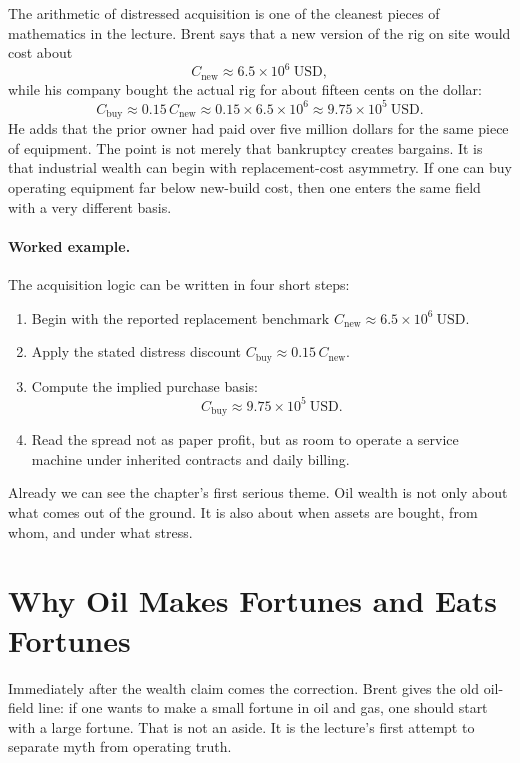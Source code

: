 The arithmetic of distressed acquisition is one of the cleanest pieces of mathematics in the lecture. Brent says that a new version of the rig on site would cost about
\begin{equation}
C_{\mathrm{new}} \approx 6.5 \times 10^6\ \mathrm{USD},
\end{equation}
while his company bought the actual rig for about fifteen cents on the dollar:
\begin{equation}
C_{\mathrm{buy}} \approx 0.15\,C_{\mathrm{new}} \approx 0.15 \times 6.5 \times 10^6 \approx 9.75 \times 10^5\ \mathrm{USD}.
\end{equation}
He adds that the prior owner had paid over five million dollars for the same piece of equipment. The point is not merely that bankruptcy creates bargains. It is that industrial wealth can begin with replacement-cost asymmetry. If one can buy operating equipment far below new-build cost, then one enters the same field with a very different basis.

\paragraph{Worked example.} The acquisition logic can be written in four short steps:
\begin{enumerate}
\item Begin with the reported replacement benchmark \(C_{\mathrm{new}} \approx 6.5 \times 10^6\ \mathrm{USD}\).
\item Apply the stated distress discount \(C_{\mathrm{buy}} \approx 0.15\,C_{\mathrm{new}}\).
\item Compute the implied purchase basis:
\[
C_{\mathrm{buy}} \approx 9.75 \times 10^5\ \mathrm{USD}.
\]
\item Read the spread not as paper profit, but as room to operate a service machine under inherited contracts and daily billing.
\end{enumerate}

Already we can see the chapter's first serious theme. Oil wealth is not only about what comes out of the ground. It is also about when assets are bought, from whom, and under what stress.

\section{Why Oil Makes Fortunes and Eats Fortunes}

Immediately after the wealth claim comes the correction. Brent gives the old oil-field line: if one wants to make a small fortune in oil and gas, one should start with a large fortune. That is not an aside. It is the lecture's first attempt to separate myth from operating truth.

